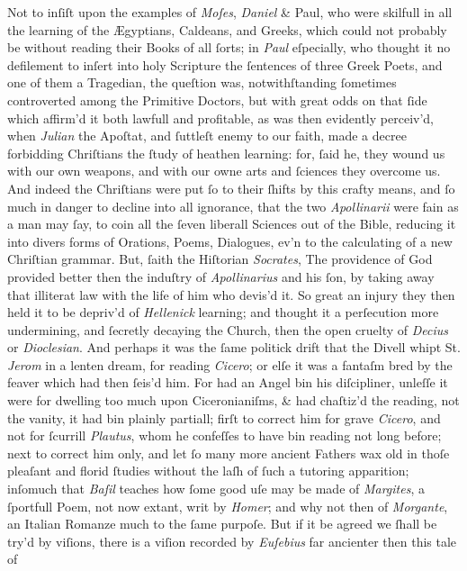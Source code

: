 Not to inſiſt upon the examples of \textit{Moſes}, \textit{Daniel} \& Paul, who
were skilfull in all the learning of the Ægyptians, Caldeans, and Greeks, which
could not probably be without reading their Books of all ſorts; in \textit{Paul}
eſpecially, who thought it no defilement to inſert into holy Scripture the
ſentences of three Greek Poets, and one of them a Tragedian, the queſtion was,
notwithſtanding ſometimes controverted among the Primitive Doctors, but with
great odds on that ſide which affirm'd it both lawfull and profitable, as was
then evidently perceiv'd, when \textit{Julian} the Apoſtat, and ſuttleſt enemy
to our faith, made a decree forbidding Chriſtians the ſtudy of heathen learning:
for, ſaid he, they wound us with our own weapons, and with our owne arts and
ſciences they overcome us.  And indeed the Chriſtians were put ſo to their
ſhifts by this crafty means, and ſo much in danger to decline into all
ignorance, that the two \textit{Apollinarii} were fain as a man may ſay, to coin
all the ſeven liberall Sciences out of the Bible, reducing it into divers forms
of Orations, Poems, Dialogues, ev'n to the calculating of a new Chriſtian
grammar.  But, ſaith the Hiſtorian \textit{Socrates}, The providence of God
provided better then the induſtry of \textit{Apollinarius} and his ſon, by
taking away that illiterat law with the life of him who devis'd it.  So great an
injury they then held it to be depriv'd of \textit{Hellenick} learning; and
thought it a perſecution more undermining, and ſecretly decaying the Church,
then the open cruelty of \textit{Decius} or \textit{Dioclesian}.  And perhaps it
was the ſame politick drift that the Divell whipt St. \textit{Jerom} in a lenten
dream, for reading \textit{Cicero}; or elſe it was a fantaſm bred by the feaver
which had then ſeis'd him.  For had an Angel bin his diſcipliner, unleſſe it
were for dwelling too much upon Ciceronianiſms, \& had chaſtiz'd the reading,
not the vanity, it had bin plainly partiall; firſt to correct him for grave
\textit{Cicero}, and not for ſcurrill \textit{Plautus}, whom he confeſſes to
have bin reading not long before; next to correct him only, and let ſo many more
ancient Fathers wax old in thoſe pleaſant and florid ſtudies without the laſh of
ſuch a tutoring apparition; inſomuch that \textit{Baſil} teaches how ſome good
uſe may be made of \textit{Margites}, a ſportfull Poem, not now extant, writ by
\textit{Homer}; and why not then of \textit{Morgante}, an Italian Romanze much
to the ſame purpoſe.  But if it be agreed we ſhall be try'd by viſions, there is
a viſion recorded by \textit{Euſebius} far ancienter then this tale of
